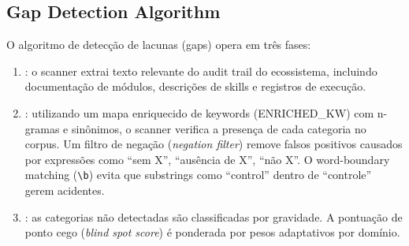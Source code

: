 \begin{table}[htb]
\centering
\caption{As 10 dimensões do espaço epistemológico noológico}
\label{tab:dimensoes-noologicas}
\small
\end{table}

\subsection{Gap Detection Algorithm}

O algoritmo de detecção de lacunas (gaps) opera em três fases:

\begin{enumerate}
\item {}: o scanner extrai texto relevante do
audit trail do ecossistema, incluindo documentação de módulos, descrições
de skills e registros de execução.
\item {}: utilizando um mapa enriquecido
de keywords (ENRICHED\_KW) com n-gramas e sinônimos, o scanner verifica a
presença de cada categoria no corpus. Um filtro de negação (\emph{negation
filter}) remove falsos positivos causados por expressões como ``sem X'',
``ausência de X'', ``não X''. O word-boundary matching (\verb|\b|) evita
que substrings como ``control'' dentro de ``controle'' gerem acidentes.
\item {}: as categorias não detectadas
são classificadas por gravidade. A pontuação de ponto cego (\emph{blind spot
score}) é ponderada por pesos adaptativos por domínio.
\end{enumerate}

